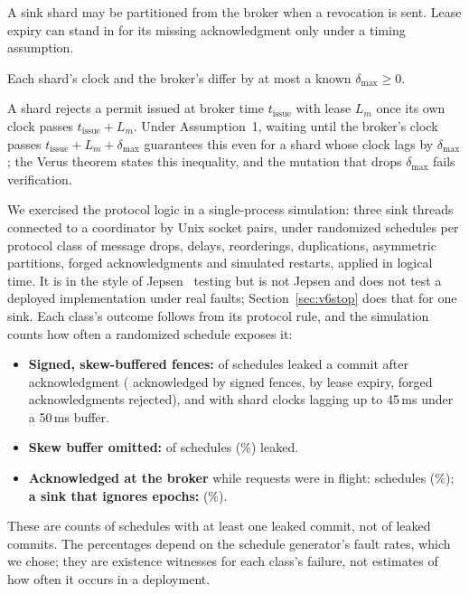 A sink shard may be partitioned from the broker when a revocation is sent. Lease expiry can stand in for its missing
acknowledgment only under a timing assumption.

 Each shard's clock and the broker's differ by at most a known
\(\delta_{\max} \ge 0\).

A shard rejects a permit issued at broker time \(t_{\mathrm{issue}}\) with lease \(L_m\) once its own clock passes
\(t_{\mathrm{issue}} + L_m\). Under Assumption~1, waiting until the broker's clock passes \(t_{\mathrm{issue}} + L_m +
\delta_{\max}\) guarantees this even for a shard whose clock lags by \(\delta_{\max}\); the Verus theorem states this
inequality, and the mutation that drops \(\delta_{\max}\) fails verification.

We exercised the protocol logic in a single-process simulation: three sink threads connected to a coordinator by Unix
socket pairs, under \VFourJepsenSchedulesPerClass{} randomized schedules per protocol class of message drops, delays,
reorderings, duplications, asymmetric partitions, forged acknowledgments and simulated restarts, applied in logical
time. It is in the style of Jepsen~\cite{kingsbury-jepsen} testing but is not Jepsen and does not test a deployed
implementation under real faults; Section~\ref{sec:v6stop} does that for one sink. Each class's outcome follows from its
protocol rule, and the simulation counts how often a randomized schedule exposes it:
\begin{itemize}
  \item \textbf{Signed, skew-buffered fences:} \VFourJepsenCoopLeaks{} of \VFourJepsenSchedulesPerClass{} schedules
        leaked a commit after acknowledgment (\VFourJepsenCoopSignedFences{} acknowledged by signed fences,
        \VFourJepsenCoopLeaseExpiries{} by lease expiry, \VFourJepsenMitmRejected{} forged acknowledgments rejected), and
        \VEightJepsenSkewBufLeaks{} with shard clocks lagging up to 45\,ms under a 50\,ms buffer.
  \item \textbf{Skew buffer omitted:} \VEightJepsenSkewUnbufLeaks{} of \VFourJepsenSchedulesPerClass{} schedules
        (\VEightJepsenSkewUnbufLeakPct\%) leaked.
  \item \textbf{Acknowledged at the broker} while requests were in flight: \VFourJepsenBrokerOnlyLeaks{} schedules
        (\VFourJepsenBrokerOnlyLeakPct\%); \textbf{a sink that ignores epochs:} \VFourJepsenUncoopLeaks{}
        (\VFourJepsenUncoopLeakPct\%).
\end{itemize}
These are counts of schedules with at least one leaked commit, not of leaked commits. The percentages depend on the
schedule generator's fault rates, which we chose; they are existence witnesses for each class's failure, not
estimates of how often it occurs in a deployment.

